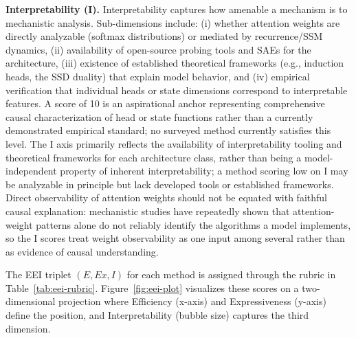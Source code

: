 \documentclass[10pt,twocolumn]{article}
\begin{document}
\textbf{Interpretability (I).} Interpretability captures how amenable a mechanism is to mechanistic analysis. Sub-dimensions include: (i) whether attention weights are directly analyzable (softmax distributions) or mediated by recurrence/SSM dynamics, (ii) availability of open-source probing tools and SAEs for the architecture, (iii) existence of established theoretical frameworks (e.g., induction heads, the SSD duality) that explain model behavior, and (iv) empirical verification that individual heads or state dimensions correspond to interpretable features. A score of 10 is an aspirational anchor representing comprehensive causal characterization of head or state functions rather than a currently demonstrated empirical standard; no surveyed method currently satisfies this level. The I axis primarily reflects the availability of interpretability tooling and theoretical frameworks for each architecture class, rather than being a model-independent property of inherent interpretability; a method scoring low on I may be analyzable in principle but lack developed tools or established frameworks. Direct observability of attention weights should not be equated with faithful causal explanation: mechanistic studies have repeatedly shown that attention-weight patterns alone do not reliably identify the algorithms a model implements, so the I scores treat weight observability as one input among several rather than as evidence of causal understanding.

The EEI triplet $(E, \mathit{Ex}, I)$ for each method is assigned through the rubric in Table~\ref{tab:eei-rubric}. Figure~\ref{fig:eei-plot} visualizes these scores on a two-dimensional projection where Efficiency (x-axis) and Expressiveness (y-axis) define the position, and Interpretability (bubble size) captures the third dimension.
\end{document}
